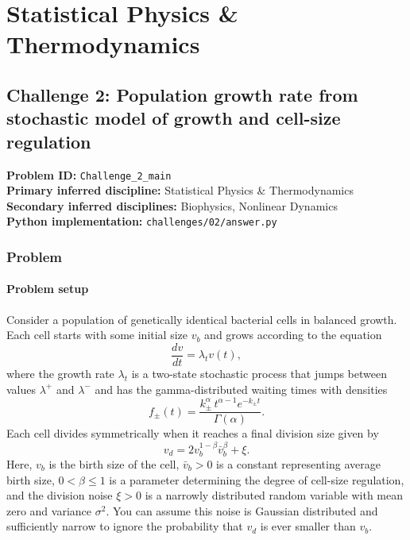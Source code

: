 \section{Statistical Physics \& Thermodynamics}
\subsection[Challenge 2: Population growth rate from stochastic model of growth and cell-size regulation]{Challenge 2: Population growth rate from stochastic model of growth and cell-size regulation}
\textbf{Problem ID:} \texttt{Challenge\_2\_main}\\
\textbf{Primary inferred discipline:} Statistical Physics \& Thermodynamics\\
\textbf{Secondary inferred disciplines:} Biophysics, Nonlinear Dynamics\\
\textbf{Python implementation:} \texttt{challenges/02/answer.py}

\subsubsection*{Problem}
\paragraph*{Problem setup}
Consider a population of genetically identical bacterial cells in balanced growth. Each cell starts with some initial size $v_b$ and grows according to the equation
\begin{equation}
    \frac{dv}{dt} = \lambda_t v(t),
\end{equation}
where the growth rate $\lambda_t$ is a two-state stochastic process that jumps between values $\lambda^+$ and $\lambda^-$ and has the gamma-distributed waiting times with densities
\begin{equation}
    f_\pm(t) = \frac{k_\pm^{\alpha}\, t^{\alpha-1} e^{-k_\pm t}}{\Gamma(\alpha)}.
\end{equation}
Each cell divides symmetrically when it reaches a final division size given by
\begin{equation}
    v_d = 2v_b^{1-\beta}\bar v_b^\beta + \xi.
\end{equation}
Here, $v_b$ is the birth size of the cell, $\bar v_b>0$ is a constant representing average birth size, $0<\beta\leq 1$ is a parameter determining the degree of cell-size regulation, and the division noise $\xi>0$ is a narrowly distributed random variable with mean zero and variance $\sigma^2$. You can assume this noise is Gaussian distributed and sufficiently narrow to ignore the probability that $v_d$ is ever smaller than $v_b$.

